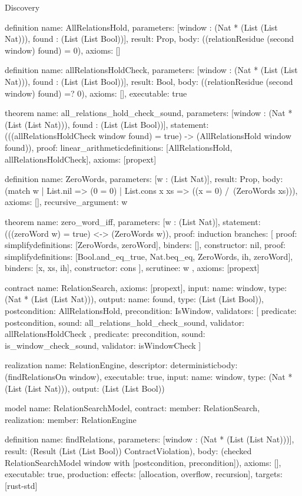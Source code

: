 \begin{lexlean}{Discovery}
\begin{semanticmodule}
definition{
  name: AllRelationsHold,
  parameters: [window : (Nat * (List (List Nat))), found : (List (List Bool))],
  result: Prop,
  body: ((relationResidue (second window) found) = 0),
  axioms: []
}

definition{
  name: allRelationsHoldCheck,
  parameters: [window : (Nat * (List (List Nat))), found : (List (List Bool))],
  result: Bool,
  body: ((relationResidue (second window) found) =? 0),
  axioms: [],
  executable: true
}

theorem{
  name: all_relations_hold_check_sound,
  parameters: [window : (Nat * (List (List Nat))), found : (List (List Bool))],
  statement: (((allRelationsHoldCheck window found) = true) -> (AllRelationsHold window found)),
  proof: linear_arithmetic{definitions: [AllRelationsHold, allRelationsHoldCheck]},
  axioms: [propext]
}

definition{
  name: ZeroWords,
  parameters: [w : (List Nat)],
  result: Prop,
  body: (match w
    | List.nil => (0 = 0)
    | List.cons x xs => ((x = 0) /\ (ZeroWords xs))),
  axioms: [],
  recursive_argument: w
}

theorem{
  name: zero_word_iff,
  parameters: [w : (List Nat)],
  statement: (((zeroWord w) = true) <-> (ZeroWords w)),
  proof: induction{
    branches: [
      {proof: simplify{definitions: [ZeroWords, zeroWord]}, binders: [], constructor: nil},
      {
        proof: simplify{definitions: [Bool.and_eq_true, Nat.beq_eq, ZeroWords, ih, zeroWord]},
        binders: [x, xs, ih],
        constructor: cons
      }
    ],
    scrutinee: w
  },
  axioms: [propext]
}

contract{
  name: RelationSearch,
  axioms: [propext],
  input: {name: window, type: (Nat * (List (List Nat)))},
  output: {name: found, type: (List (List Bool))},
  postcondition: AllRelationsHold,
  precondition: IsWindow,
  validators: [
    {
      predicate: postcondition,
      sound: all_relations_hold_check_sound,
      validator: allRelationsHoldCheck
    },
    {predicate: precondition, sound: is_window_check_sound, validator: isWindowCheck}
  ]
}

realization{
  name: RelationEngine,
  descriptor: deterministic{body: (findRelationsOn window)},
  executable: true,
  input: {name: window, type: (Nat * (List (List Nat)))},
  output: (List (List Bool))
}

model{
  name: RelationSearchModel,
  contract: {member: RelationSearch},
  realization: {member: RelationEngine}
}

definition{
  name: findRelations,
  parameters: [window : (Nat * (List (List Nat)))],
  result: (Result (List (List Bool)) ContractViolation),
  body: (checked RelationSearchModel window with [postcondition, precondition]),
  axioms: [],
  executable: true,
  production: {effects: [allocation, overflow, recursion], targets: [rust-std]}
}


\end{semanticmodule}
\end{lexlean}
